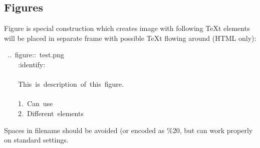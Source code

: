 \documentclass[12pt]{article}
\begin{document}
\subsection{Figures}

Figure is special construction which creates image with following \TeX{}t
elements will be placed in separate frame with possible \TeX{}t flowing around
(HTML only):

\begin{ttfamily}\begin{flushleft}
\mbox{~..~figure::~test.png}\\
\mbox{~~~~:identify:}\\
\mbox{}\\
\mbox{~~~~This~is~description~of~this~figure.}\\
\mbox{}\\
\mbox{~~~~1.~Can~use~}\\
\mbox{~~~~2.~Different~elements}\\
\end{flushleft}\end{ttfamily}

Spaces in filename should be avoided (or encoded as \%20, but can work properly
on standard settings.
\end{document}
